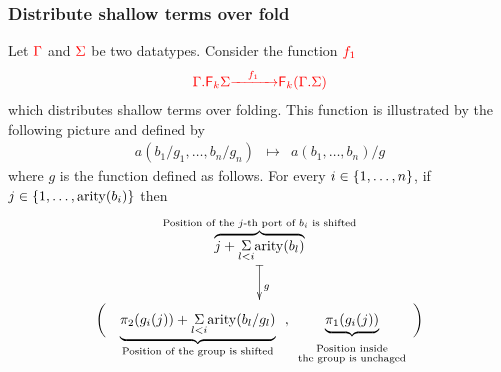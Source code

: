\subsubsection{Distribute shallow terms over fold}
 Let ${\color{red}{\Gamma}}$ and ${\color{red}{\Sigma}}$ be two datatypes.  Consider the function ${\color{red}{f_1}}$
\begin{align*}
{\color{red}{{\color{red}{\Gamma . {\color{red}{\mathsf F_{k}}}\Sigma}}}} {\color{red}{\xrightarrow{\quad f_1 \quad}}} {\color{red}{{\color{red}{\mathsf F_{k}}}({\color{red}{\Gamma . \Sigma}})}}
\end{align*}
which distributes shallow terms over folding. This function is illustrated by the following picture
and  defined by 
$$\begin{array}{rcl} 
a(b_1/g_1,\dots,b_n/g_n)&\mapsto& a(b_1,\dots,b_n)/g
\end{array}$$
where $g$ is the function defined as follows. For every  $i \in\{1,\dots,n\}$,  if  $j\in\{1,\dots,\mathrm{arity}(b_i)\}$ then 
 \begin{align*}
 \xymatrix@C=5cm{
 \begin{array}{c}
 \overbrace{j+\underset{l<i}{\Sigma} \arity{b_l}}^{\text{Position of the $j$-th port of $b_i$ is shifted}}
 \end{array}
 \ar@{|->}[d]^{g}\\
 \begin{array}{c}
  \biggl(\ \ \ \underbrace{\pi_2(g_i(j))+\underset{l<i}{\Sigma} \arity{b_l/g_l}}_{\text{Position of the group is shifted}}\ \ , \underbrace{\pi_1(g_i(j))}_{\begin{array}{c}
{ \scriptsize\text{Position inside}}\\[-5pt]{\scriptsize \text{the group is unchaged}}
 \end{array}}\biggr)
 \end{array}}
 \end{align*}
 



